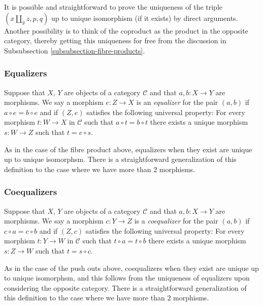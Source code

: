 \noindent
It is possible and straightforward to prove the uniqueness of the triple
$(x\amalg_y z, p, q)$ up to unique isomorphism (if it exists) by direct
arguments. Another possibility is to think of the coproduct as the
product in the opposite category, thereby getting this uniqueness for
free from the discussion in Subsubsection \ref{subsubsection-fibre-products}.

\subsubsection{Equalizers}
\label{subsubsection-equalizers}

\begin{definition}
\label{definition-equalizers}
Suppose that $X$, $Y$ are objects of a category $\mathcal{C}$
and that $a, b : X \to Y$ are morphisms. We say a morphism
$e : Z \to X$ is an {\it equalizer} for the pair $(a,b)$ if
$a \circ e = b \circ e$ and if $(Z,e)$ satisfies the following
universal property: For every morphism $t : W \to X$
in $\mathcal{C}$ such that $a \circ t = b \circ t$ there exists
a unique morphism $s : W \to Z$ such that $t = e \circ s$.
\end{definition}

\noindent
As in the case of the fibre product above, equalizers when
they exist are unique up to unique isomorphsm. There is a
straightforward generalization of this definition to the
case where we have more than $2$ morphisms.

\subsubsection{Coequalizers}
\label{subsubsection-coequalizers}

\begin{definition}
\label{definition-coequalizers}
Suppose that $X$, $Y$ are objects of a category $\mathcal{C}$
and that $a, b : X \to Y$ are morphisms. We say a morphism
$c : Y \to Z$ is a {\it coequalizer} for the pair $(a,b)$ if
$c \circ a = c \circ b$ and if $(Z,c)$ satisfies the following
universal property: For every morphism $t : Y \to W$
in $\mathcal{C}$ such that $t \circ a = t \circ b$ there exists
a unique morphism $s : Z \to W$ such that $t = s \circ c$.
\end{definition}

\noindent
As in the case of the push outs above, coequalizers when
they exist are unique up to unique isomorphsm, and this follows
from the uniqueness of equalizers upon considering the opposite
category. There is a straightforward generalization of this definition
to the case where we have more than $2$ morphisms.

